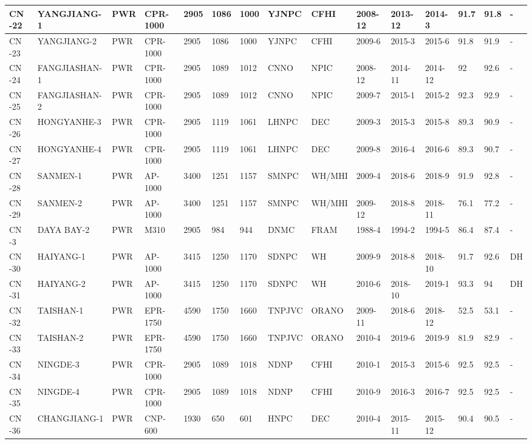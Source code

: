 \begin{table}
\begin{tabular}{|l|l|l|l|l|l|l|l|l|l|l|l|l|l|}
    CN -22 & YANGJIANG-1 & PWR & CPR-1000 & 2905 & 1086 & 1000 & YJNPC & CFHI & 2008-12 & 2013-12 & 2014-3 & 91.7 & 91.8 & - \\ \hline
    CN -23 & YANGJIANG-2 & PWR & CPR-1000 & 2905 & 1086 & 1000 & YJNPC & CFHI & 2009-6 & 2015-3 & 2015-6 & 91.8 & 91.9 & - \\ \hline
    CN -24 & FANGJIASHAN-1 & PWR & CPR-1000 & 2905 & 1089 & 1012 & CNNO & NPIC & 2008-12 & 2014-11 & 2014-12 & 92 & 92.6 & - \\ \hline
    CN -25 & FANGJIASHAN-2 & PWR & CPR-1000 & 2905 & 1089 & 1012 & CNNO & NPIC & 2009-7 & 2015-1 & 2015-2 & 92.3 & 92.9 & - \\ \hline
    CN -26 & HONGYANHE-3 & PWR & CPR-1000 & 2905 & 1119 & 1061 & LHNPC & DEC & 2009-3 & 2015-3 & 2015-8 & 89.3 & 90.9 & - \\ \hline
    CN -27 & HONGYANHE-4 & PWR & CPR-1000 & 2905 & 1119 & 1061 & LHNPC & DEC & 2009-8 & 2016-4 & 2016-6 & 89.3 & 90.7 & - \\ \hline
    CN -28 & SANMEN-1 & PWR & AP-1000 & 3400 & 1251 & 1157 & SMNPC & WH/MHI & 2009-4 & 2018-6 & 2018-9 & 91.9 & 92.8 & - \\ \hline
    CN -29 & SANMEN-2 & PWR & AP-1000 & 3400 & 1251 & 1157 & SMNPC & WH/MHI & 2009-12 & 2018-8 & 2018-11 & 76.1 & 77.2 & - \\ \hline
    CN -3 & DAYA BAY-2 & PWR & M310 & 2905 & 984 & 944 & DNMC & FRAM & 1988-4 & 1994-2 & 1994-5 & 86.4 & 87.4 & - \\ \hline
    CN -30 & HAIYANG-1 & PWR & AP-1000 & 3415 & 1250 & 1170 & SDNPC & WH & 2009-9 & 2018-8 & 2018-10 & 91.7 & 92.6 & DH \\ \hline
    CN -31 & HAIYANG-2 & PWR & AP-1000 & 3415 & 1250 & 1170 & SDNPC & WH & 2010-6 & 2018-10 & 2019-1 & 93.3 & 94 & DH \\ \hline
    CN -32 & TAISHAN-1 & PWR & EPR-1750 & 4590 & 1750 & 1660 & TNPJVC & ORANO & 2009-11 & 2018-6 & 2018-12 & 52.5 & 53.1 & - \\ \hline
    CN -33 & TAISHAN-2 & PWR & EPR-1750 & 4590 & 1750 & 1660 & TNPJVC & ORANO & 2010-4 & 2019-6 & 2019-9 & 81.9 & 82.9 & - \\ \hline
    CN -34 & NINGDE-3 & PWR & CPR-1000 & 2905 & 1089 & 1018 & NDNP & CFHI & 2010-1 & 2015-3 & 2015-6 & 92.5 & 92.5 & - \\ \hline
    CN -35 & NINGDE-4 & PWR & CPR-1000 & 2905 & 1089 & 1018 & NDNP & CFHI & 2010-9 & 2016-3 & 2016-7 & 92.5 & 92.5 & - \\ \hline
    CN -36 & CHANGJIANG-1 & PWR & CNP-600 & 1930 & 650 & 601 & HNPC & DEC & 2010-4 & 2015-11 & 2015-12 & 90.4 & 90.5 & - \\ \hline

\end{tabular}
\end{table}

